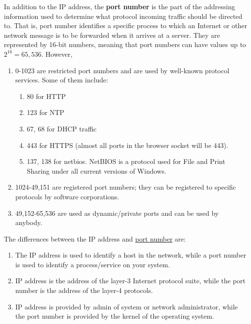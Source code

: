 \documentclass{article}
\newcounter{definition}[section]
\begin{document}
  \begin{definition}
    \label{def:port-number}
  In addition to the IP address, the \textbf{port number} is the part of the addressing information used to determine what protocol incoming traffic should be directed to. That is, port number identifies a specific process to which an Internet or other network message is to be forwarded when it arrives at a server. They are represented by 16-bit numbers, meaning that port numbers can have values up to $2^{16} = 65,536$. However,
  \begin{enumerate}
      \item 0-1023 are restricted port numbers and are used by well-known protocol services. Some of them include:
      \begin{enumerate}
          \item 80 for HTTP
          \item 123 for NTP
          \item 67, 68 for DHCP traffic
          \item 443 for HTTPS (almost all ports in the browser socket will be 443). 
          \item 137, 138 for netbios. NetBIOS is a protocol used for File and Print Sharing under all current versions of Windows. 
      \end{enumerate}
      \item 1024-49,151 are registered port numbers; they can be registered to specific protocols by software corporations.
      \item 49,152-65,536 are used as dynamic/private ports and can be used by anybody. 
  \end{enumerate}
  \end{definition}

  The differences between the IP address and \hyperref[def:port-number]{port number} are: 
  \begin{enumerate}
      \item The IP address is used to identify a host in the network, while a port number is used to identify a process/service on your system. 
      \item IP address is the address of the layer-3 Internet protocol suite, while the port number is the address of the layer-4 protocols. 
      \item IP address is provided by admin of system or network administrator, while the port number is provided by the kernel of the operating system. 
  \end{enumerate}
\end{document}
